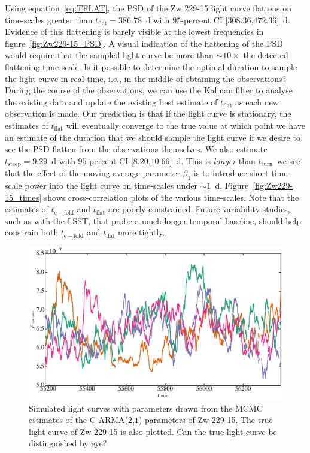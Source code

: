 \documentclass[a4paper,fleqn,usenatbib]{mnras}
\begin{document}
Using equation~\eqref{eq:TFLAT}, the PSD of the Zw 229-15 light curve flattens on time-scales greater than $t_{\mathrm{flat}} = 386.78$~d with $95$-percent CI [$308.36$,$472.36$]~d. Evidence of this flattening is barely visible at the lowest frequencies in figure~\ref{fig:Zw229-15_PSD}. A visual indication of the flattening of the PSD would require that the sampled light curve be more than $\sim 10 \times$ the detected flattening time-scale. Is it possible to determine the optimal duration to sample the light curve in real-time, i.e., in the middle of obtaining the observations? During the course of the observations, we can use the Kalman filter to analyse the existing data and update the existing best estimate of  $t_{\mathrm{flat}}$ as each new observation is made. Our prediction is that if the light curve is stationary, the estimates of $t_{\mathrm{flat}}$ will eventually converge to the true value at which point we have an estimate of the duration that we should sample the light curve if we desire to see the PSD flatten from the observations themselves. We also estimate $t_{\mathrm{steep}} = 9.29$~d with $95$-percent CI [$8.20$,$10.66$]~d. This is \textit{longer} than $t_{\mathrm{turn}}$--we see that the effect of the moving average parameter $\beta_{1}$ is to introduce short time-scale power into the light curve on time-scales under $\sim 1$~d. Figure~\ref{fig:Zw229-15_times} shows cross-correlation plots of the various time-scales. Note that the estimates of $t_\mathrm{e-fold}$ and $t_{\mathrm{flat}}$ are poorly constrained. Future variability studies, such as with the LSST, that probe a much longer temporal baseline, should help constrain both $t_{\mathrm{e-fold}}$ and $t_{\mathrm{flat}}$ more tightly.

\begin{figure}
	\includegraphics[width=\columnwidth]{images/Zw229-15_mockLC.jpg}
    \caption{Simulated light curves with parameters drawn from the MCMC estimates of the C-ARMA($2$,$1$) parameters of Zw 229-15. The true light curve of Zw 229-15 is also plotted. Can the true light curve be distinguished by eye?}  
    \label{fig:Zw229-15_mock}
\end{figure}
\end{document}
